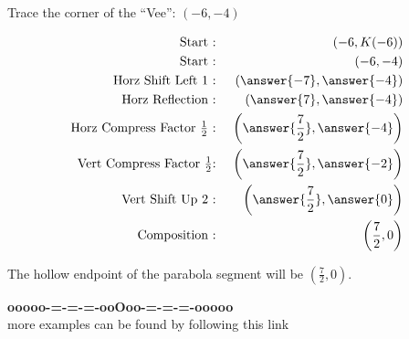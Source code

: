 \documentclass{ximera}
\begin{document}
\begin{procedure} 



Trace the corner of the ``Vee'': $(-6, -4)$





\begin{align*}
\text{Start :} & \text{  } & (-6, K(-6))  \\
\text{Start :} & \text{  } & (-6, -4) \\
\text{Horz Shift Left $1$ :} & \text{  } & \left( \answer{-7}, \answer{-4} \right)   \\
\text{Horz Reflection :} & \text{  } & \left( \answer{7}, \answer{-4} \right)   \\
\text{Horz Compress Factor $\tfrac{1}{2}$ :}  & \text{  } & \left( \answer{\frac{7}{2}}, \answer{-4} \right)   \\
\text{Vert Compress Factor $\tfrac{1}{2}$:} & \text{  } & \left( \answer{\frac{7}{2}}, \answer{-2} \right)   \\
\text{Vert Shift Up $2$ :} & \text{  } & \left( \answer{\frac{7}{2}}, \answer{0} \right)   \\
\text{Composition :} & \text{  } & \left( \frac{7}{2}, 0 \right)   
\end{align*}


The hollow endpoint of the parabola segment will be $\left( \frac{7}{2}, 0 \right)$.

\end{procedure}













\begin{center}
\textbf{\textcolor{green!50!black}{ooooo-=-=-=-ooOoo-=-=-=-ooooo}} \\

more examples can be found by following this link\\ 

\end{center}
\end{document}
